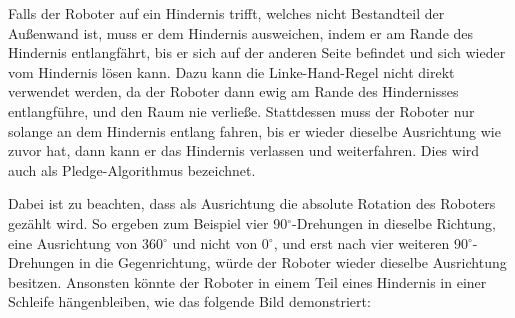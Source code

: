 \documentclass[10pt,a4paper]{article}
\begin{document}
\begin{center}
\end{center}

Falls der Roboter auf ein Hindernis trifft, welches nicht Bestandteil der Außenwand ist, muss er dem Hindernis ausweichen, indem er am Rande des Hindernis entlangfährt, bis er sich auf der anderen Seite befindet und sich wieder vom Hindernis lösen kann. %
Dazu kann  die Linke-Hand-Regel nicht direkt verwendet werden, da der Roboter dann ewig am Rande des Hindernisses entlangführe, und den Raum nie verließe. Stattdessen muss der Roboter nur solange an dem Hindernis entlang fahren, bis er wieder dieselbe Ausrichtung wie zuvor hat, dann kann er das Hindernis verlassen und %
weiterfahren. Dies wird auch als Pledge-Algorithmus bezeichnet.

Dabei ist zu beachten, dass als Ausrichtung die absolute Rotation des Roboters gezählt wird. So ergeben zum Beispiel vier 90$^\circ$-Drehungen in dieselbe Richtung, eine Ausrichtung von 360$^\circ$ und nicht von 0$^\circ$, und erst nach vier weiteren 90$^\circ$-Drehungen in die Gegenrichtung, würde der Roboter wieder dieselbe Ausrichtung besitzen. Ansonsten könnte der Roboter in einem Teil eines Hindernis in einer Schleife hängenbleiben, wie das folgende Bild demonstriert:
 
\end{document}
